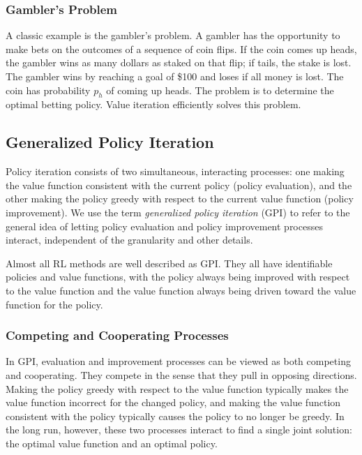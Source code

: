 \documentclass[12pt]{article}
\begin{document}
\subsubsection{Gambler's Problem}

A classic example is the gambler's problem. A gambler has the opportunity to make bets on the outcomes of a sequence of coin flips. If the coin comes up heads, the gambler wins as many dollars as staked on that flip; if tails, the stake is lost. The gambler wins by reaching a goal of \$100 and loses if all money is lost. The coin has probability $p_h$ of coming up heads. The problem is to determine the optimal betting policy. Value iteration efficiently solves this problem.

\subsection{Generalized Policy Iteration}

Policy iteration consists of two simultaneous, interacting processes: one making the value function consistent with the current policy (policy evaluation), and the other making the policy greedy with respect to the current value function (policy improvement). We use the term \textit{generalized policy iteration} (GPI) to refer to the general idea of letting policy evaluation and policy improvement processes interact, independent of the granularity and other details.

Almost all RL methods are well described as GPI. They all have identifiable policies and value functions, with the policy always being improved with respect to the value function and the value function always being driven toward the value function for the policy.

\subsubsection{Competing and Cooperating Processes}

In GPI, evaluation and improvement processes can be viewed as both competing and cooperating. They compete in the sense that they pull in opposing directions. Making the policy greedy with respect to the value function typically makes the value function incorrect for the changed policy, and making the value function consistent with the policy typically causes the policy to no longer be greedy. In the long run, however, these two processes interact to find a single joint solution: the optimal value function and an optimal policy.
\end{document}
